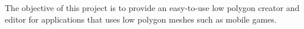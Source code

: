 The objective of this project is to provide an easy-to-use low polygon creator and editor for applications that uses low polygon meshes such as mobile games.